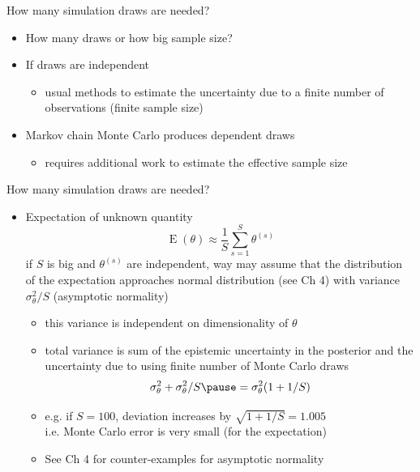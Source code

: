 \documentclass[finnish,english,t]{beamer}
\renewcommand{\emph}[1]{\textcolor{navyblue}{#1}}
\DeclareMathOperator{\E}{E}
\begin{document}
\begin{frame}
{How many simulation draws are needed?}

  \begin{itemize}
  \item How many draws or how big sample size?
  \item If draws are independent
    \begin{itemize}
    \item usual methods to estimate the uncertainty due to a finite
      number of observations (finite sample size)
    \end{itemize}
  \item Markov chain Monte Carlo produces dependent draws
    \begin{itemize}
    \item requires additional work to estimate the \emph{effective
        sample size}
    \end{itemize}
  \end{itemize}

\end{frame}

\begin{frame}{How many simulation draws are needed?}

  \begin{itemize}
  \item Expectation of unknown quantity
    \begin{equation*}
      \E(\theta)\approx \frac{1}{S}\sum_{s=1}^S \theta^{(s)}
    \end{equation*}
    if $S$ is big and $\theta^{(s)}$ are independent, way may assume
    that the distribution of the expectation approaches normal
    distribution (see Ch 4) with variance $\sigma^2_\theta/S$
    (asymptotic normality)
    \begin{itemize}
    \item this variance is independent on dimensionality of $\theta$
      \pause
    \item total variance is sum of the epistemic uncertainty in the
      posterior and the uncertainty due to using finite number of
      Monte Carlo draws
      \begin{equation*}
        \sigma^2_\theta+\sigma^2_\theta/S \pause= \sigma^2_\theta(1+1/S)
      \end{equation*}
      \pause
      \vspace{-5mm}
    \item e.g. if $S=100$, deviation increases by $\sqrt{1+1/S}=1.005$\\
      i.e. Monte Carlo error is very small (for the expectation)
      \pause
    \item See Ch 4 for counter-examples for asymptotic normality
    \end{itemize}
\end{itemize}

\end{frame}
\end{document}
